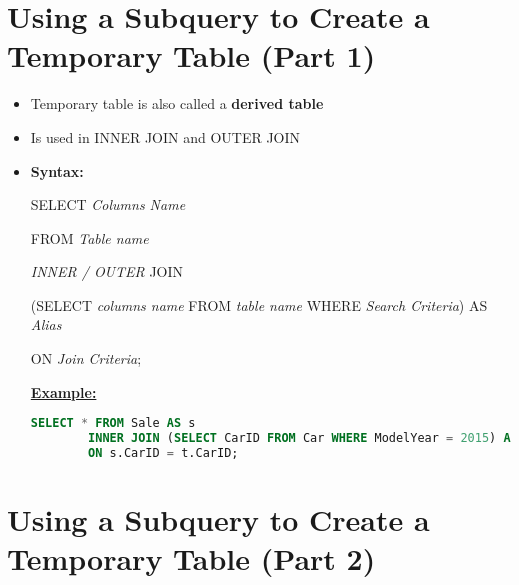 \documentclass[12pt]{article}
\begin{document}
\bigskip

\section{Using a Subquery to Create a Temporary Table (Part 1)}

\bigskip


\begin{itemize}
    \item Temporary table is also called a \textbf{derived table}
    \item Is used in INNER JOIN and OUTER JOIN
    \item \textbf{Syntax:}

    SELECT \textit{Columns Name}

    FROM \textit{Table name}

    \textit{INNER / OUTER} JOIN

    (SELECT \textit{columns name} FROM \textit{table name} WHERE \textit{Search Criteria}) AS \textit{Alias}

    ON \textit{Join Criteria};

    \bigskip

    \underline{\textbf{Example:}}

    \bigskip

    \begin{lstlisting}[language=SQL]
    SELECT * FROM Sale AS s
        INNER JOIN (SELECT CarID FROM Car WHERE ModelYear = 2015) AS t
        ON s.CarID = t.CarID;
    \end{lstlisting}
\end{itemize}

\bigskip

\section{Using a Subquery to Create a Temporary Table (Part 2)}

\bigskip
\end{document}
